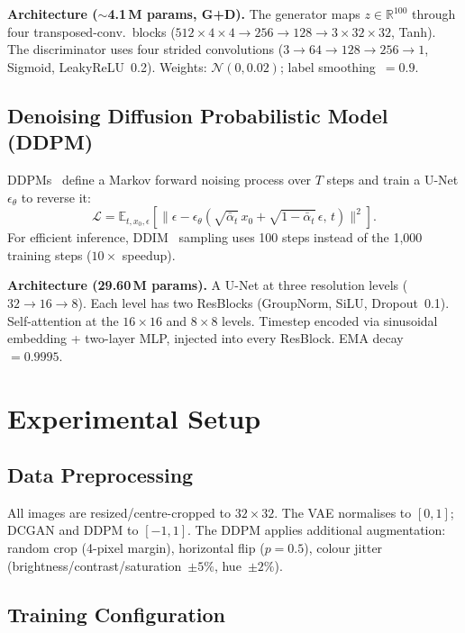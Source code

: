 \documentclass{llncs}
\begin{document}
\textbf{Architecture ($\sim$4.1\,M params, G+D).}
The generator maps $z\in\mathbb{R}^{100}$ through four
transposed-conv.\ blocks
($512{\times}4{\times}4\!\to\!256\!\to\!128\!\to\!3{\times}32{\times}32$,
Tanh). The discriminator uses four strided convolutions
($3\!\to\!64\!\to\!128\!\to\!256\!\to\!1$, Sigmoid, LeakyReLU~0.2).
Weights: $\mathcal{N}(0,0.02)$; label smoothing~$=0.9$.

\subsection{Denoising Diffusion Probabilistic Model (DDPM)}

DDPMs~\cite{ho2020} define a Markov forward noising process over $T$ steps
and train a U-Net $\epsilon_\theta$ to reverse it:
\begin{equation}
  \mathcal{L} = \mathbb{E}_{t,x_0,\epsilon}\!\left[
    \bigl\|\epsilon - \epsilon_\theta\!\left(
      \sqrt{\bar\alpha_t}\,x_0+\sqrt{1{-}\bar\alpha_t}\,\epsilon,\,t
    \right)\bigr\|^2\right].
\end{equation}
For efficient inference, DDIM~\cite{dhariwal2021} sampling uses 100 steps
instead of the 1,000 training steps ($10\times$ speedup).

\textbf{Architecture (29.60\,M params).}
A U-Net at three resolution levels ($32\!\to\!16\!\to\!8$). Each level
has two ResBlocks (GroupNorm, SiLU, Dropout~0.1). Self-attention at the
$16{\times}16$ and $8{\times}8$ levels. Timestep encoded via sinusoidal
embedding + two-layer MLP, injected into every ResBlock.
EMA decay~$=0.9995$.

\section{Experimental Setup}
\label{sec:setup}

\subsection{Data Preprocessing}

All images are resized/centre-cropped to $32\times32$. The VAE normalises
to $[0,1]$; DCGAN and DDPM to $[-1,1]$. The DDPM applies additional
augmentation: random crop (4-pixel margin), horizontal flip ($p=0.5$),
colour jitter (brightness/contrast/saturation~$\pm5\%$, hue~$\pm2\%$).

\subsection{Training Configuration}
\end{document}
